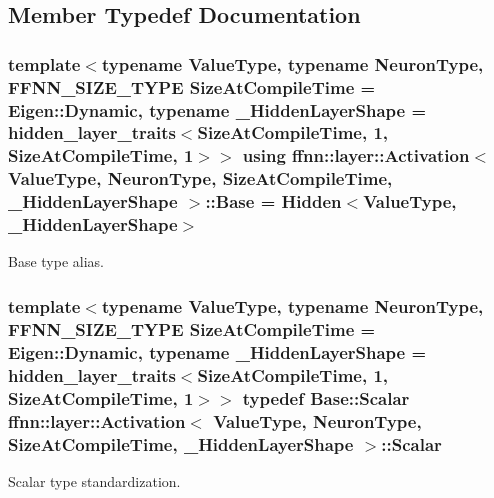 \subsection{Member Typedef Documentation}
\hypertarget{classffnn_1_1layer_1_1_activation_a2f462178d98a5439e13962796c483459}{
\subsubsection[{Base}]{\setlength{\rightskip}{0pt plus 5cm}template$<$typename Value\-Type, typename Neuron\-Type, F\-F\-N\-N\-\_\-\-S\-I\-Z\-E\-\_\-\-T\-Y\-P\-E Size\-At\-Compile\-Time = Eigen\-::\-Dynamic, typename \-\_\-\-Hidden\-Layer\-Shape = hidden\-\_\-layer\-\_\-traits$<$\-Size\-At\-Compile\-Time, 1, Size\-At\-Compile\-Time, 1$>$$>$ using {\bf ffnn\-::layer\-::\-Activation}$<$ Value\-Type, Neuron\-Type, Size\-At\-Compile\-Time, \-\_\-\-Hidden\-Layer\-Shape $>$\-::{\bf Base} =  {\bf Hidden}$<$Value\-Type, \-\_\-\-Hidden\-Layer\-Shape$>$}}\label{classffnn_1_1layer_1_1_activation_a2f462178d98a5439e13962796c483459}


Base type alias. 

\hypertarget{classffnn_1_1layer_1_1_activation_a5b1e9d46855882ea22be0b9703d67832}{
\subsubsection[{Scalar}]{\setlength{\rightskip}{0pt plus 5cm}template$<$typename Value\-Type, typename Neuron\-Type, F\-F\-N\-N\-\_\-\-S\-I\-Z\-E\-\_\-\-T\-Y\-P\-E Size\-At\-Compile\-Time = Eigen\-::\-Dynamic, typename \-\_\-\-Hidden\-Layer\-Shape = hidden\-\_\-layer\-\_\-traits$<$\-Size\-At\-Compile\-Time, 1, Size\-At\-Compile\-Time, 1$>$$>$ typedef {\bf Base\-::\-Scalar} {\bf ffnn\-::layer\-::\-Activation}$<$ Value\-Type, Neuron\-Type, Size\-At\-Compile\-Time, \-\_\-\-Hidden\-Layer\-Shape $>$\-::{\bf Scalar}}}\label{classffnn_1_1layer_1_1_activation_a5b1e9d46855882ea22be0b9703d67832}


Scalar type standardization. 



